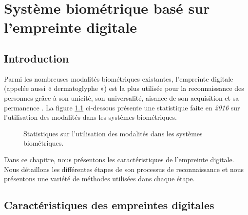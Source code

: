 \chapter{Système biométrique basé sur l'empreinte digitale}
\label{Chapter2} %

\section{Introduction}
\tab Parmi les nombreuses modalités biométriques existantes, l'empreinte digitale (appelée aussi « dermatoglyphe ») est la plus utilisée pour la reconnaissance des personnes grâce à son unicité, son universalité, aisance de son acquisition et sa permanence \citep{maltoni2009handbook}. La figure \ref{chapitre2fingerstat} ci-dessous présente une statistique faite en \textit{2016} sur l'utilisation des modalités dans les systèmes biométriques.

\begin{figure}[H]
	\centering
	\caption{Statistiques sur l'utilisation des modalités dans les systèmes biométriques\citep{Counter2016}.}
	\label{chapitre2fingerstat}
\end{figure}
Dans ce chapitre, nous présentons les caractéristiques de l’empreinte digitale. Nous détaillons les différentes étapes de son processus de reconnaissance et nous présentons une variété de méthodes utilisées dans chaque étape.

\section{Caractéristiques des empreintes digitales}

